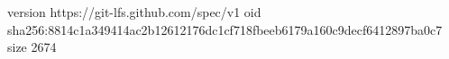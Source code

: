 version https://git-lfs.github.com/spec/v1
oid sha256:8814c1a349414ac2b12612176dc1cf718fbeeb6179a160c9decf6412897ba0c7
size 2674
